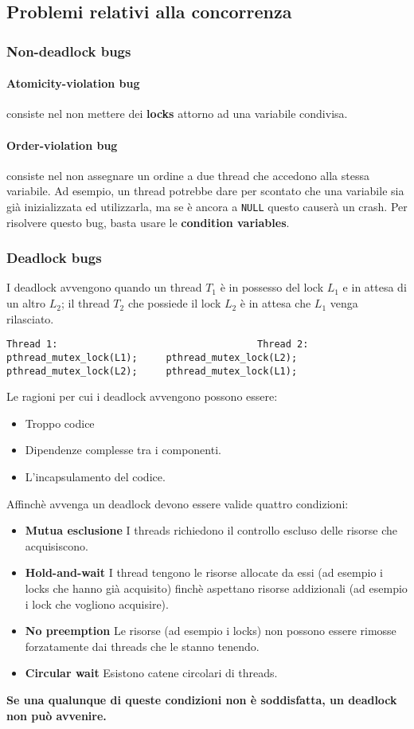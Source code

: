 \documentclass[12pt, letterpaper]{article}
\begin{document}
		\subsection{Problemi relativi alla concorrenza}
			\subsubsection{Non-deadlock bugs}
				\paragraph{Atomicity-violation bug} consiste nel non mettere dei \textbf{locks} attorno ad una variabile condivisa.
				\paragraph{Order-violation bug} consiste nel non assegnare un ordine a due thread che accedono alla stessa variabile. Ad esempio, un thread potrebbe dare per scontato che una variabile sia già inizializzata ed utilizzarla, ma se è ancora a \texttt{NULL} questo causerà un crash. Per risolvere questo bug, basta usare le \textbf{condition variables}.
				
			\subsubsection{Deadlock bugs}
				I deadlock avvengono quando un thread $T_1$ è in possesso del lock $L_1$ e in attesa di un altro $L_2$; il thread $T_2$ che possiede il lock $L_2$ è in attesa che $L_1$ venga rilasciato.
				\begin{lstlisting}[style=CStyle]
Thread 1:									Thread 2:
pthread_mutex_lock(L1);		pthread_mutex_lock(L2);
pthread_mutex_lock(L2);		pthread_mutex_lock(L1);\end{lstlisting}
				Le ragioni per cui i deadlock avvengono possono essere: 
				\begin{itemize}
					\item Troppo codice
					\item Dipendenze complesse tra i componenti.
					\item L'incapsulamento del codice.
				\end{itemize}
				Affinchè avvenga un deadlock devono essere valide quattro condizioni: 
				\begin{itemize}
					\item \textbf{Mutua esclusione} I threads richiedono il controllo escluso delle risorse che acquisiscono.
					\item \textbf{Hold-and-wait} I thread tengono le risorse allocate da essi (ad esempio i locks che hanno già acquisito) finchè aspettano risorse addizionali (ad esempio i lock che vogliono acquisire).
					\item \textbf{No preemption} Le risorse (ad esempio i locks) non possono essere rimosse forzatamente dai threads che le stanno tenendo.
					\item \textbf{Circular wait} Esistono catene circolari di threads.
				\end{itemize}
				\textbf{Se una qualunque di queste condizioni non è soddisfatta, un deadlock non può avvenire.}
\end{document}
